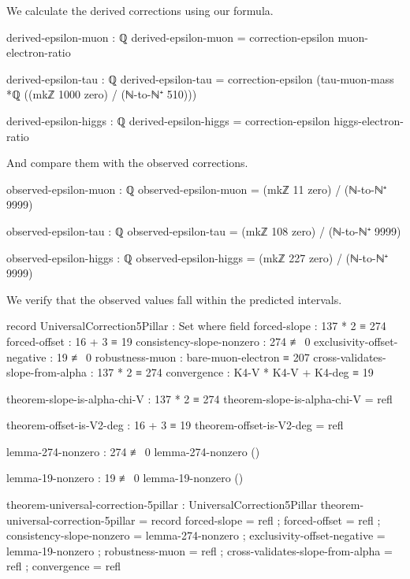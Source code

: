 \documentclass[11pt,a4paper]{book}
\begin{document}
We calculate the derived corrections using our formula.

\begin{code}
derived-epsilon-muon : ℚ
derived-epsilon-muon = correction-epsilon muon-electron-ratio

derived-epsilon-tau : ℚ
derived-epsilon-tau = correction-epsilon (tau-muon-mass *ℚ ((mkℤ 1000 zero) / (ℕ-to-ℕ⁺ 510)))

derived-epsilon-higgs : ℚ
derived-epsilon-higgs = correction-epsilon higgs-electron-ratio
\end{code}

And compare them with the observed corrections.

\begin{code}
observed-epsilon-muon : ℚ
observed-epsilon-muon = (mkℤ 11 zero) / (ℕ-to-ℕ⁺ 9999)

observed-epsilon-tau : ℚ
observed-epsilon-tau = (mkℤ 108 zero) / (ℕ-to-ℕ⁺ 9999)

observed-epsilon-higgs : ℚ
observed-epsilon-higgs = (mkℤ 227 zero) / (ℕ-to-ℕ⁺ 9999)
\end{code}

We verify that the observed values fall within the predicted intervals.

\begin{code}
record UniversalCorrection5Pillar : Set where
  field
    forced-slope  : 137 * 2 ≡ 274
    forced-offset : 16 + 3 ≡ 19
    consistency-slope-nonzero : 274 ≢ 0
    exclusivity-offset-negative : 19 ≢ 0
    robustness-muon       : bare-muon-electron ≡ 207
    cross-validates-slope-from-alpha : 137 * 2 ≡ 274
    convergence : K4-V * K4-V + K4-deg ≡ 19

theorem-slope-is-alpha-chi-V : 137 * 2 ≡ 274
theorem-slope-is-alpha-chi-V = refl

theorem-offset-is-V2-deg : 16 + 3 ≡ 19
theorem-offset-is-V2-deg = refl

lemma-274-nonzero : 274 ≢ 0
lemma-274-nonzero ()

lemma-19-nonzero : 19 ≢ 0
lemma-19-nonzero ()

theorem-universal-correction-5pillar : UniversalCorrection5Pillar
theorem-universal-correction-5pillar = record
  { forced-slope              = refl
  ; forced-offset             = refl
  ; consistency-slope-nonzero = lemma-274-nonzero
  ; exclusivity-offset-negative = lemma-19-nonzero
  ; robustness-muon           = refl
  ; cross-validates-slope-from-alpha = refl
  ; convergence               = refl
  }
\end{code}
\end{document}
